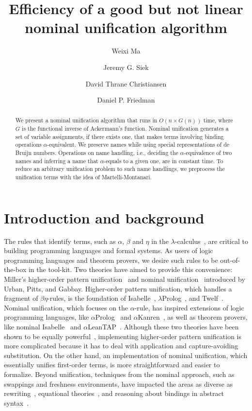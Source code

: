 \documentclass[a4paper,UKenglish]{lipics-v2016}
\title{Efficiency of a good but not linear nominal unification algorithm}
\author[1]{Weixi Ma}
\author[2]{Jeremy G. Siek}
\author[3]{David Thrane Christiansen}
\author[4]{Daniel P. Friedman}
\affil[1]{Indiana University,
  \texttt{mvc@iu.edu}}
\affil[2]{Indiana University,
  \texttt{jsiek@indiana.edu}}
\affil[3]{Galois, Inc.,
  \texttt{dtc@galois.com}}
\affil[4]{Indiana University,
  \texttt{dfried@indiana.edu}}
\begin{document}
\maketitle

\begin{abstract}
  We present a nominal unification algorithm
  that runs in $O(n \times G(n))$ time,
  where $G$ is the functional inverse of Ackermann's function.
  Nominal unification generates a set of variable assignments,
  if there exists one,
  that makes terms involving binding operations $\alpha$-equivalent.
  We preserve names while using special representations of de Bruijn numbers.
  Operations on name handling, i.e.,
  deciding the $\alpha$-equivalence of two names and
  inferring a name that $\alpha$-equals to a given one,
  are in constant time.
  To reduce an arbitrary unification problem to such name handlings,
  we preprocess the unification terms
  with the idea of Martelli-Montanari.
\end{abstract}

\section{Introduction and background}
The rules that identify terms, such as $\alpha$, $\beta$ and $\eta$
in the $\lambda$-calculus~\cite{church_calculi_1941},
are critical to building programming languages and formal systems.
As users of logic programming languages and theorem provers,
we desire such rules to be out-of-the-box in the tool-kit.
Two theories have aimed to provide this convenience:
Miller's higher-order pattern unification~\cite{miller_logic_1989} and
nominal unification~\cite{urban_nominal_2004} introduced by Urban, Pitts, and Gabbay.
Higher-order pattern unification, which handles a fragment of $\beta\eta$-rules,
is the foundation of Isabelle~\cite{paulson_natural_1986}, $\lambda$Prolog~\cite{nadathur_overview_1988}, and Twelf~\cite{pfenning_system_1999-1}.
Nominal unification, which focuses on the $\alpha$-rule,
has inspired extensions of logic programming languages, like $\alpha$Prolog~\cite{cheney_prolog:_2004} and $\alpha$Kanren~\cite{byrd_kanren:_2007},
as well as theorem provers, like nominal Isabelle~\cite{urban_nominal_2005} and $\alpha$LeanTAP~\cite{near_leantap:_2008}.
Although these two theories have been shown to be equally powerful~\cite{cheney_relating_2005},
implementing higher-order pattern unification is more complicated
because it has to deal with application and capture-avoiding substitution.
On the other hand, an implementation of nominal unification,
which essentially unifies first-order terms,
is more straightforward and easier to formalize.
Beyond unification, techniques from the nominal approach,
such as swappings and freshness environments,
have impacted the areas as diverse as
rewriting~\cite{fernandez_nominal_2004, fernandez_nominal_2005, fernandez_nominal_2007, aoto_nominal_2016},
equational theories~\cite{ayala-rincon_nominal_2016},
and reasoning about bindings in abstract syntax~\cite{pitts_metalanguage_2000, gabbay_new_2002}.
\end{document}
